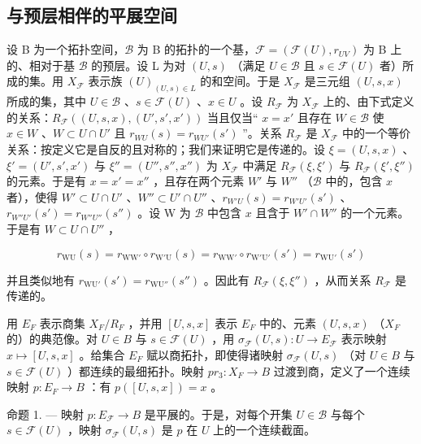 \subsection{与预层相伴的平展空间}

设 B 为一个拓扑空间，\(\mathcal{B}\) 为 B 的拓扑的一个基，\(\mathcal{F} = (\mathcal{F}(U), r_{UV})\) 为 B 上的、相对于基 \(\mathcal{B}\) 的预层。设 L 为对 \((U, s)\) （满足 \(U \in \mathcal{B}\) 且 \(s \in \mathcal{F}(U)\) 者）所成的集。用 \(X_{\mathcal{F}}\) 表示族 \((U)_{(U,s) \in L}\) 的和空间。于是 \(X_{\mathcal{F}}\) 是三元组 \((U, s, x)\) 所成的集，其中 \(U \in \mathcal{B}\) 、\(s \in \mathcal{F}(U)\) 、\(x \in U\) 。设 \(R_{\mathcal{F}}\) 为 \(X_{\mathcal{F}}\) 上的、由下式定义的关系：\(R_{\mathcal{F}}((U,s,x),(U',s',x'))\) 当且仅当“ \(x = x'\) 且存在 \(W \in \mathcal{B}\) 使 \(x \in W\) 、\(W \subset U \cap U'\) 且 \(r_{WU}(s) = r_{WU'}(s')\) ”。关系 \(R_{\mathcal{F}}\) 是 \(X_{\mathcal{F}}\) 中的一个等价关系：按定义它是自反的且对称的；我们来证明它是传递的。设 \(\xi = (U, s, x)\) 、\(\xi' = (U', s', x')\) 与 \(\xi'' = (U'', s'', x'')\) 为 \(X_{\mathcal{F}}\) 中满足 \(R_{\mathcal{F}}(\xi,\xi')\) 与 \(R_{\mathcal{F}}(\xi',\xi'')\) 的元素。于是有 \(x = x' = x''\) ，且存在两个元素 \(W'\) 与 \(W''\) （\(\mathcal{B}\) 中的，包含 \(x\) 者），使得 \(W' \subset U \cap U'\) 、\(W'' \subset U' \cap U''\) 、\(r_{W'U}(s) = r_{W'U'}(s')\) 、\(r_{W''U'}(s') = r_{W''U''}(s'')\) 。设 W 为 \(\mathcal{B}\) 中包含 \(x\) 且含于 \(W' \cap W''\) 的一个元素。于是有 \(W \subset U \cap U''\) ，

\[
r_{\mathrm{WU}}(s) = r_{\mathrm{WW'}} \circ r_{\mathrm{W'U}}(s) = r_{\mathrm{WW'}} \circ r_{\mathrm{W'U'}}(s') = r_{\mathrm{WU'}}(s')
\]

并且类似地有 \(r_{\mathrm{WU}'}(s') = r_{\mathrm{WU}''}(s'')\) 。因此有 \(R_{\mathcal{F}}(\xi,\xi'')\) ，从而关系 \(R_{\mathcal{F}}\) 是传递的。

用 \(E_{F}\) 表示商集 \(X_{F}/R_{F}\) ，并用 \([U,s,x]\) 表示 \(E_{F}\) 中的、元素 \((U,s,x)\) （\(X_{F}\) 的）的典范像。对 \(U \in B\) 与 \(s \in \mathcal{F}(U)\) ，用 \(\sigma_{\mathcal{F}}(U,s)\colon U \to E_{\mathcal{F}}\) 表示映射 \(x \mapsto [U,s,x]\) 。给集合 \(E_{F}\) 赋以商拓扑，即使得诸映射 \(\sigma_{\mathcal{F}}(U,s)\) （对 \(U \in B\) 与 \(s \in \mathcal{F}(U)\) ）都连续的最细拓扑。映射 \(pr_{3}\colon X_{F} \to B\) 过渡到商，定义了一个连续映射 \(p\colon E_{F} \to B\) ：有 \(p([U,s,x]) = x\) 。

命题 1. --- 映射 \(p\colon E_{\mathcal{F}} \to B\) 是平展的。于是，对每个开集 \(U \in \mathcal{B}\) 与每个 \(s \in \mathcal{F}(U)\) ，映射 \(\sigma_{\mathcal{F}}(U, s)\) 是 \(p\) 在 \(U\) 上的一个连续截面。

